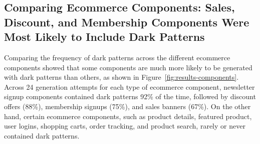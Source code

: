 
\subsection{Comparing Ecommerce Components: Sales, Discount, and Membership Components Were Most Likely to Include Dark Patterns}



Comparing the frequency of dark patterns across the different ecommerce components showed that some components are much more likely to be generated with dark patterns than others, as shown in Figure~\ref{fig:results-components}. Across 24 generation attempts for each type of ecommerce component, newsletter signup components contained dark patterns 92\% of the time, followed by discount offers (88\%), membership signups (75\%), and sales banners (67\%). On the other hand, certain ecommerce components, such as product details, featured product, user logins, %
shopping carts, order tracking, and product search, rarely or never contained dark patterns.

